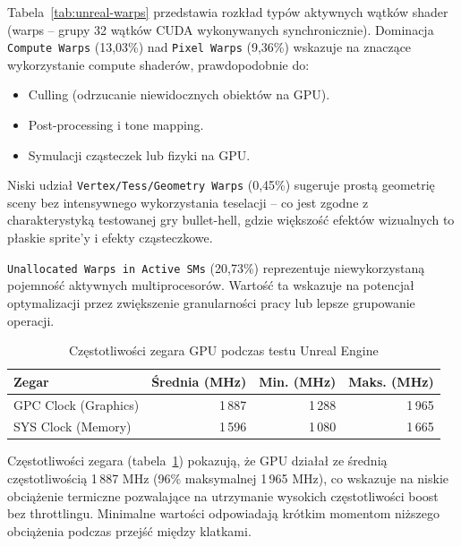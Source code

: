 Tabela~\ref{tab:unreal-warps} przedstawia rozkład typów aktywnych wątków shader 
(warps -- grupy 32 wątków CUDA wykonywanych synchronicznie). 
 Dominacja \texttt{Compute Warps} (13,03\%) nad \texttt{Pixel Warps} (9,36\%) wskazuje na znaczące wykorzystanie compute shaderów, prawdopodobnie do:
\begin{itemize}
    \item Culling (odrzucanie niewidocznych obiektów na GPU).
    \item Post-processing i tone mapping.
    \item Symulacji cząsteczek lub fizyki na GPU.
\end{itemize}

Niski udział \texttt{Vertex/Tess/Geometry Warps} (0,45\%) sugeruje prostą geometrię sceny bez intensywnego wykorzystania teselacji -- 
co jest zgodne z charakterystyką testowanej gry bullet-hell, gdzie większość efektów wizualnych to płaskie sprite'y i efekty cząsteczkowe.

\texttt{Unallocated Warps in Active SMs} (20,73\%) reprezentuje niewykorzystaną pojemność 
aktywnych multiprocesorów. Wartość ta wskazuje na 
potencjał optymalizacji przez zwiększenie granularności pracy lub lepsze grupowanie operacji.

\begin{table}[H]
\centering
\caption{Częstotliwości zegara GPU podczas testu Unreal Engine}
\label{tab:unreal-gpu-clocks}
\begin{tabular}{|l|r|r|r|}
\hline
\textbf{Zegar} & \textbf{Średnia (MHz)} & \textbf{Min. (MHz)} & \textbf{Maks. (MHz)} \\
\hline
GPC Clock (Graphics) & 1\,887 & 1\,288 & 1\,965 \\
SYS Clock (Memory) & 1\,596 & 1\,080 & 1\,665 \\
\hline
\end{tabular}
\end{table}

Częstotliwości zegara (tabela~\ref{tab:unreal-gpu-clocks}) pokazują, że GPU działał ze średnią częstotliwością 1\,887 MHz 
(96\% maksymalnej 1\,965 MHz), co wskazuje na niskie obciążenie termiczne pozwalające na utrzymanie wysokich częstotliwości boost bez throttlingu. 
Minimalne wartości odpowiadają krótkim momentom niższego obciążenia podczas przejść między klatkami.


